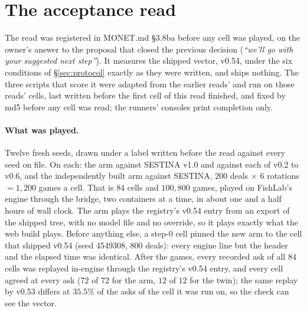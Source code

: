 \documentclass[11pt]{article}
\newcommand{\monet}{MONET.md}
\newcommand{\sect}[1]{\S#1}
\newcommand{\VWallHours}{one and a half}
\newcommand{\VPinsTwin}{$12$ of $12$}
\begin{document}
\section{The acceptance read}
\label{sec:accept}

The read was registered in \monet{} \sect{3.8ba} before any cell was played, on the owner's answer to
the proposal that closed the previous decision (\emph{``we'll go with your suggested next step''}). It
measures the shipped vector, v0.54, under the six conditions of \sect\ref{sec:protocol} exactly as
they were written, and ships nothing. The three scripts that score it were adapted from the earlier reads' and
run on those reads' cells, last written before the first cell of this read finished, and fixed by md5
before any cell was read; the runners' consoles print completion only.

\paragraph{What was played.} Twelve fresh seeds, drawn under a label written before the read against
every seed on file. On each: the arm against SESTINA v1.0 and against each of v0.2 to v0.6, and the
independently built arm against SESTINA, $200$ deals $\times$ $6$ rotations $= 1{,}200$ games a cell.
That is $84$ cells and $100{,}800$ games, played on FishLab's engine through the bridge, two containers
at a time, in about \VWallHours{} hours of wall clock. The arm plays the registry's v0.54 entry from an
export of the shipped tree, with no model file and no override, so it plays exactly what the web
build plays. Before anything else, a step-0 cell pinned the new arm to the cell that shipped v0.54
(seed 4549308, $800$ deals): every engine line but the header and the elapsed time was identical.
After the games, every recorded ask of all $84$ cells was replayed in-engine through the registry's
v0.54 entry, and every cell agreed at every ask ($72$ of $72$ for the arm, \VPinsTwin{} for the twin);
the same replay by v0.53 differs at $35.5\%$ of the asks of the cell it was run on, so the check can
see the vector.
\end{document}

